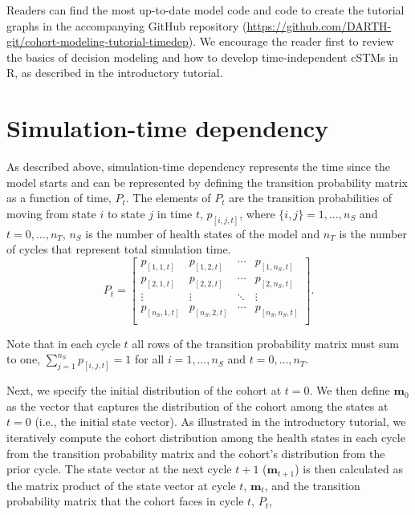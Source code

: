 \documentclass[
]{article}
\begin{document}
Readers can find the most up-to-date model code and code to create the tutorial graphs in the accompanying GitHub repository (\url{https://github.com/DARTH-git/cohort-modeling-tutorial-timedep}). We encourage the reader first to review the basics of decision modeling and how to develop time-independent cSTMs in R, as described in the introductory tutorial.

\hypertarget{simulation-time-dependency}{%
\section{Simulation-time dependency}\label{simulation-time-dependency}}

As described above, simulation-time dependency represents the time since the model starts and can be represented by defining the transition probability matrix as a function of time, \(P_t\). The elements of \(P_t\) are the transition probabilities of moving from state \(i\) to state \(j\) in time \(t\), \(p_{[i,j,t]}\), where \(\{i,j\} = 1,\ldots, n_S\) and \(t = 0,\ldots,n_T\), \(n_S\) is the number of health states of the model and \(n_T\) is the number of cycles that represent total simulation time.
\[
  P_t = 
  \begin{bmatrix}
    p_{[1,1,t]} & p_{[1,2,t]} & \cdots & p_{[1,n_S,t]} \\
    p_{[2,1,t]} & p_{[2,2,t]} & \cdots & p_{[2,n_S,t]} \\
    \vdots    & \vdots  & \ddots & \vdots   \\
    p_{[n_S,1,t]} & p_{[n_S,2,t]} & \cdots & p_{[n_S,n_S,t]} \\
  \end{bmatrix}.
\]

Note that in each cycle \(t\) all rows of the transition probability matrix must sum to one, \(\sum_{j=1}^{n_S}{p_{[i,j,t]}} = 1\) for all \(i = 1,\ldots,n_S\) and \(t = 0,\ldots, n_T\).

Next, we specify the initial distribution of the cohort at \(t = 0\). We then define \(\mathbf{m}_{0}\) as the vector that captures the distribution of the cohort among the states at \(t = 0\) (i.e., the initial state vector). As illustrated in the introductory tutorial, we iteratively compute the cohort distribution among the health states in each cycle from the transition probability matrix and the cohort's distribution from the prior cycle. The state vector at the next cycle \(t+1\) (\(\mathbf{m}_{t+1}\)) is then calculated as the matrix product of the state vector at cycle \(t\), \(\mathbf{m}_{t}\), and the transition probability matrix that the cohort faces in cycle \(t\), \(P_t\),
\end{document}
